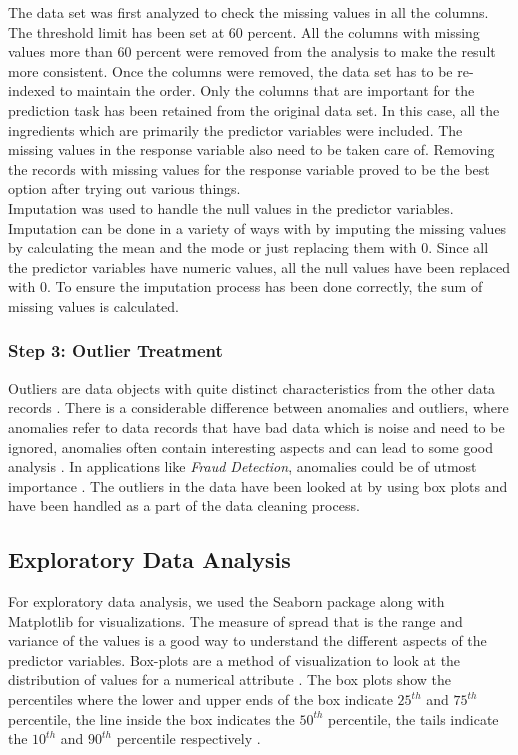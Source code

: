 \documentclass[sigconf]{acmart}
\begin{document}
The data set was first analyzed to check the missing values in all the columns. The threshold limit has been set at 60 percent. All the columns with missing values more than 60 percent were removed from the analysis to make the result more consistent. Once the columns were removed, the data set has to be re-indexed to maintain the order. Only the columns that are important for the prediction task has been retained from the original data set. In this case, all the ingredients which are primarily the predictor variables were included. The missing values in the response variable also need to be taken care of. Removing the records with missing values for the response variable proved to be the best option after trying out various things. \\

Imputation was used to handle the null values in the predictor variables. Imputation can be done in a variety of ways with by imputing the missing values by calculating the mean and the mode or just replacing them with 0. Since all the predictor variables have numeric values, all the null values have been replaced with 0. To ensure the imputation process has been done correctly, the sum of missing values is calculated.

\subsubsection{Step 3: Outlier Treatment}
Outliers are data objects with quite distinct characteristics from the other data records \cite{book-tan}. There is a considerable difference between anomalies and outliers, where anomalies refer to data records that have bad data which is noise and need to be ignored, anomalies often contain interesting aspects and can lead to some good analysis \cite{book-tan}. In applications like {\em Fraud Detection}, anomalies could be of utmost importance \cite{book-tan}. The outliers in the data have been looked at by using box plots and have been handled as a part of the data cleaning process.

\subsection{Exploratory Data Analysis}
For exploratory data analysis, we used the Seaborn package along with Matplotlib for visualizations. The measure of spread that is the range and variance of the values is a good way to understand the different aspects of the predictor variables. Box-plots are a method of visualization to look at the distribution of values for a numerical attribute \cite{book-tan}. The box plots show the percentiles where the lower and upper ends of the box indicate $25^{th}$ and $75^{th}$ percentile, the line inside the box indicates the $50^{th}$ percentile, the tails indicate the $10^{th}$ and $90^{th}$ percentile respectively \cite{book-tan}. \\
\end{document}
